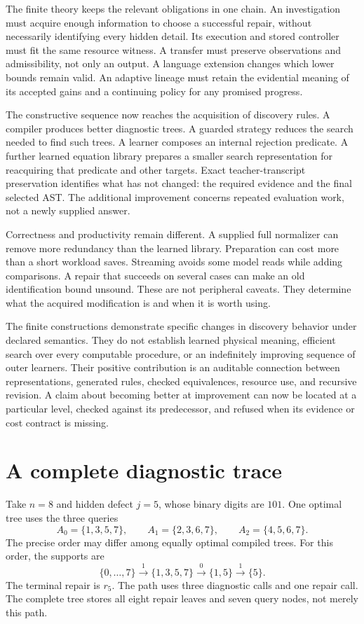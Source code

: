 \documentclass[11pt,letterpaper]{article}
\theoremstyle{plain}
\theoremstyle{definition}
\begin{document}
The finite theory keeps the relevant obligations in one chain. An investigation must acquire enough information to choose a successful repair, without necessarily identifying every hidden detail. Its execution and stored controller must fit the same resource witness. A transfer must preserve observations and admissibility, not only an output. A language extension changes which lower bounds remain valid. An adaptive lineage must retain the evidential meaning of its accepted gains and a continuing policy for any promised progress.

The constructive sequence now reaches the acquisition of discovery rules. A compiler produces better diagnostic trees. A guarded strategy reduces the search needed to find such trees. A learner composes an internal rejection predicate. A further learned equation library prepares a smaller search representation for reacquiring that predicate and other targets. Exact teacher-transcript preservation identifies what has not changed: the required evidence and the final selected AST. The additional improvement concerns repeated evaluation work, not a newly supplied answer.

Correctness and productivity remain different. A supplied full normalizer can remove more redundancy than the learned library. Preparation can cost more than a short workload saves. Streaming avoids some model reads while adding comparisons. A repair that succeeds on several cases can make an old identification bound unsound. These are not peripheral caveats. They determine what the acquired modification is and when it is worth using.

The finite constructions demonstrate specific changes in discovery behavior under declared semantics. They do not establish learned physical meaning, efficient search over every computable procedure, or an indefinitely improving sequence of outer learners. Their positive contribution is an auditable connection between representations, generated rules, checked equivalences, resource use, and recursive revision. A claim about becoming better at improvement can now be located at a particular level, checked against its predecessor, and refused when its evidence or cost contract is missing.

\appendix
\section{A complete diagnostic trace}\label{app:trace}
Take $n=8$ and hidden defect $j=5$, whose binary digits are $101$. One optimal tree uses the three queries
\[
A_0=\{1,3,5,7\},\qquad A_1=\{2,3,6,7\},\qquad A_2=\{4,5,6,7\}.
\]
The precise order may differ among equally optimal compiled trees. For this order, the supports are
\[
\{0,\ldots,7\}\xrightarrow{1}\{1,3,5,7\}
\xrightarrow{0}\{1,5\}\xrightarrow{1}\{5\}.
\]
The terminal repair is $r_5$. The path uses three diagnostic calls and one repair call. The complete tree stores all eight repair leaves and seven query nodes, not merely this path.
\end{document}
